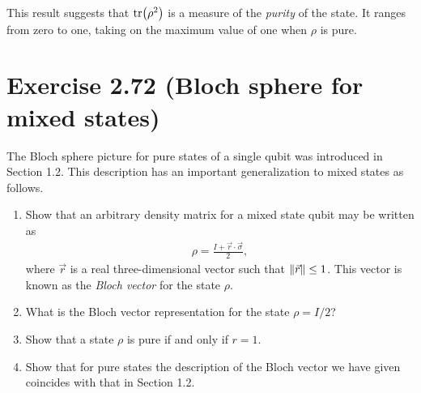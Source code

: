 \documentclass{book}
\begin{document}
    This result suggests that $\tr(\rho^2)$ is a measure of the \emph{purity} of the state. It ranges from zero to one, taking on the maximum value of one when $\rho$ is pure. 

\section*{Exercise 2.72 (Bloch sphere for mixed states)}
    The Bloch sphere picture for pure states of a single qubit was introduced in Section 1.2. This description has an important generalization to mixed states as follows.

    \begin{enumerate}
        \item Show that an arbitrary density matrix for a mixed state qubit may be written as
        \begin{align}
            \rho = \frac{I + \vec{r}\cdot \vec{\sigma}}{2},
        \end{align}
        where $\vec{r}$ is a real three-dimensional vector such that $\norm{\vec{r}} \leq 1$. This vector is known as the \emph{Bloch vector} for the state $\rho$. 
        \item What is the Bloch vector representation for the state $\rho = I/2$?
        \item Show that a state $\rho$ is pure if and only if $r = 1$.
        \item Show that for pure states the description of the Bloch vector we have given coincides with that in Section 1.2.
    \end{enumerate}
\end{document}
